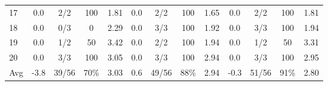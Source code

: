 \begin{table}[p]
{\begin{tabular}{l|cccc|cccc|cccc}
17 & 0.0 & 2/2 & 100 & 1.81 & 0.0 & 2/2 & 100 & 1.65 & 0.0 & 2/2 & 100 & 1.81 \\
18 & 0.0 & 0/3 & 0 & 2.29 & 0.0 & 3/3 & 100 & 1.92 & 0.0 & 3/3 & 100 & 1.94 \\
19 & 0.0 & 1/2 & 50 & 3.42 & 0.0 & 2/2 & 100 & 1.94 & 0.0 & 1/2 & 50 & 3.31 \\
20 & 0.0 & 3/3 & 100 & 3.05 & 0.0 & 3/3 & 100 & 2.94 & 0.0 & 3/3 & 100 & 2.95 \\
\midrule
Avg & -3.8 & 39/56 & 70\% & 3.03 & 0.6 & 49/56 & 88\% & 2.94 & -0.3 & 51/56 & 91\% & 2.80 \\
\bottomrule
\end{tabular}%
}
\end{table}
